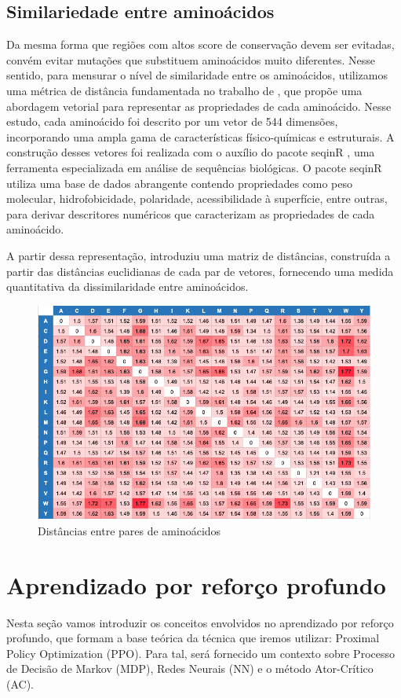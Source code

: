 \subsection{Similariedade entre aminoácidos}
\label{subsection:AminoDist}
Da mesma forma que regiões com altos score de conservação devem ser evitadas, 
convém evitar mutações que substituem aminoácidos muito diferentes.
Nesse sentido, para mensurar o nível de similaridade entre os aminoácidos,
utilizamos uma métrica de distância fundamentada no trabalho de \cite{aminodist}, 
que propõe uma abordagem vetorial para representar as propriedades de cada aminoácido.
Nesse estudo, cada aminoácido foi descrito por um vetor de 544 dimensões, 
incorporando uma ampla gama de características físico-químicas e estruturais. 
A construção desses vetores foi realizada com o auxílio do pacote seqinR \cite{seqinR}, 
uma ferramenta especializada em análise de sequências biológicas.
O pacote seqinR utiliza uma base de dados abrangente contendo propriedades como peso molecular,
hidrofobicidade, polaridade, acessibilidade à superfície, entre outras,
para derivar descritores numéricos que caracterizam as propriedades de cada aminoácido.

A partir dessa representação, \cite{aminodist} introduziu
uma matriz de distâncias, construída a partir das distâncias euclidianas de cada par 
de vetores, fornecendo uma medida quantitativa da dissimilaridade entre aminoácidos.


\begin{figure}[H]
    \centering
    \includegraphics[width=.8\textwidth]{figuras/matrix_amino_dist.png}
    \caption{Distâncias entre pares de aminoácidos \cite{aminodist}}
    \label{fig:matrixaminodist}
  \end{figure}


\section{Aprendizado por reforço profundo}
Nesta seção vamos introduzir os conceitos envolvidos no aprendizado por reforço profundo, que formam a base teórica da técnica que iremos utilizar: Proximal Policy Optimization (PPO). 
Para tal, será fornecido um contexto sobre Processo de Decisão de Markov (MDP), Redes Neurais (NN) e o método Ator-Crítico (AC). 


